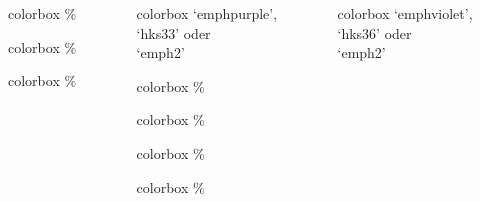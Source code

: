 \documentclass[german,notoc,draft]{tudbeamer}%
\begin{document}
\begin{frame}
\begin{columns}[T,onlytextwidth]
\begin{column}{.19\textwidth}
\begin{beamercolorbox}[wd=0.9\textwidth,sep=1em]{colorbox}
				\%
		    \end{beamercolorbox}
			\begin{beamercolorbox}[wd=0.9\textwidth,sep=1em]{colorbox}
				\%
		    \end{beamercolorbox}
			\begin{beamercolorbox}[wd=0.9\textwidth,sep=1em]{colorbox}
				\%
		    \end{beamercolorbox}
		\end{column}
		\begin{column}{.19\textwidth}%
			\begin{beamercolorbox}[wd=0.9\textwidth,sep=1em]{colorbox}
				\centering `emphpurple',\\ `hks33' oder\\ `emph2'
		    \end{beamercolorbox}
			\begin{beamercolorbox}[wd=0.9\textwidth,sep=1em]{colorbox}
				\%
		    \end{beamercolorbox}
			\begin{beamercolorbox}[wd=0.9\textwidth,sep=1em]{colorbox}
				\%
		    \end{beamercolorbox}
			\begin{beamercolorbox}[wd=0.9\textwidth,sep=1em]{colorbox}
				\%
		    \end{beamercolorbox}
			\begin{beamercolorbox}[wd=0.9\textwidth,sep=1em]{colorbox}
				\%
		    \end{beamercolorbox}
		\end{column}
		\begin{column}{.19\textwidth}%
			\begin{beamercolorbox}[wd=0.9\textwidth,sep=1em]{colorbox}
				\centering `emphviolet',\\ `hks36' oder\\ `emph2'
		    \end{beamercolorbox}

\end{column}
\end{columns}
\end{frame}
\end{document}
